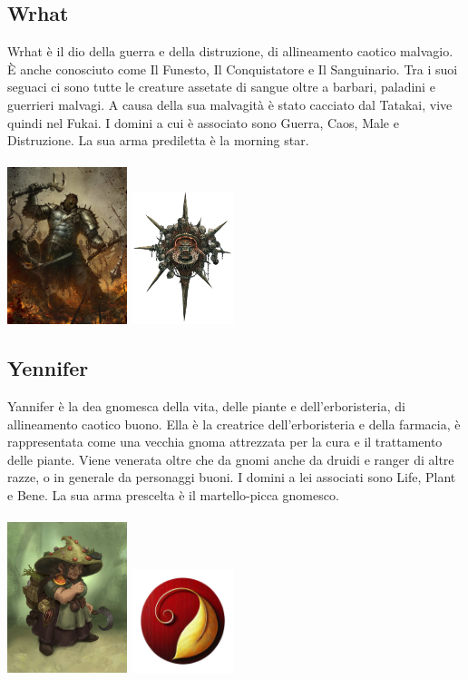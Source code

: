 \documentclass[10pt, a4paper]{report}
\begin{document}
\begin{multicols}{2}
\subsection*{Wrhat}
Wrhat è il dio della guerra e della distruzione, di allineamento caotico malvagio. È anche conosciuto come Il Funesto, Il Conquistatore e Il Sanguinario. Tra i suoi seguaci ci sono tutte le creature assetate di sangue oltre a barbari, paladini e guerrieri malvagi. A causa della sua malvagità è stato cacciato dal Tatakai, vive quindi nel Fukai. I domini a cui è associato sono Guerra, Caos, Male e Distruzione. La sua arma prediletta è la morning star.\\
\\
\includegraphics[width=3.5cm]{wrhat.jpeg}
\includegraphics[width=3cm]{wrhat_simbolo.jpeg}
\subsection*{Yennifer}
Yannifer è la dea gnomesca della vita, delle piante e dell'erboristeria, di allineamento caotico buono. Ella è la creatrice dell'erboristeria e della farmacia, è rappresentata come una vecchia gnoma attrezzata per la cura e il trattamento delle piante. Viene venerata oltre che da gnomi anche da druidi e ranger di altre razze, o in generale da personaggi buoni. I domini a lei associati sono Life, Plant e Bene. La sua arma prescelta è il martello-picca gnomesco.\\
\\
\includegraphics[width=3.5cm]{yennifer.jpg}
\includegraphics[width=3cm]{yennifer_simbolo.jpeg}
\end{multicols}
\end{document}

